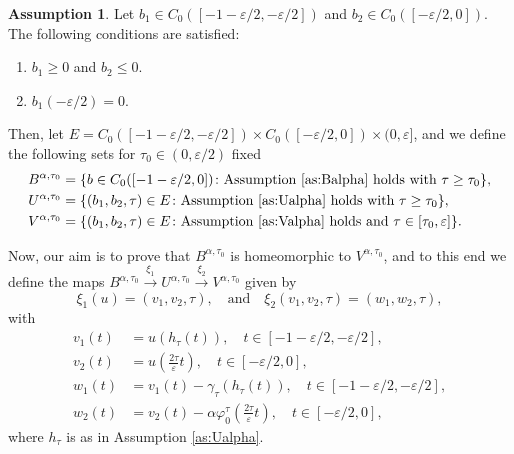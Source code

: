 \documentclass[a4paper,11pt]{article}
\theoremstyle{plain}
\theoremstyle{definition}
\newtheorem{assumption}{Assumption}[section]
\theoremstyle{definition}
\numberwithin{equation}{section}
\begin{document}
\begin{assumption}\label{as:Valpha}
Let $b_1\in C_0([-1-\varepsilon/2, -\varepsilon/2])$ and $b_2\in C_0([-\varepsilon/2,0])$. The following conditions are satisfied:
\begin{enumerate}[label={\roman*)}]
    \item $b_1\geq 0$ and $b_2\leq 0$.
    \item $b_1(-\varepsilon/2) =0$.
\end{enumerate}
\end{assumption}

Then, let $E=C_0([-1-\varepsilon/2,-\varepsilon/2])\times C_0([-\varepsilon/2,0])\times (0,\varepsilon]$, and we define the following sets for $\tau_0\in(0,\varepsilon/2)$ fixed
\begin{align}
    B^{\alpha,\tau_0} &= \{ b\in C_0([-1-\varepsilon/2,0]) \colon \text{Assumption \ref{as:Balpha} holds with}~\tau\geq \tau_0 \},\\
    U^{\alpha,\tau_0} &= \{ (b_1,b_2,\tau)\in E \colon \text{Assumption \ref{as:Ualpha} holds with}~\tau\geq \tau_0 \},\\
    V^{\alpha,\tau_0} &= \{ (b_1,b_2,\tau)\in E \colon \text{Assumption \ref{as:Valpha} holds and}~\tau\in [\tau_0, \varepsilon]\}.
\end{align}

Now, our aim is to prove that $B^{\alpha,\tau_0}$ is homeomorphic to $V^{\alpha,\tau_0}$, and to this end we define the maps $B^{\alpha,\tau_0} \xrightarrow{\xi_1} U^{\alpha,\tau_0} \xrightarrow{\xi_2} V^{\alpha,\tau_0}$ given by
\[
    \xi_1(u) = (v_1,v_2,\tau), \quad \text{and}\quad \xi_2(v_1,v_2,\tau) = (w_1,w_2,\tau),
\]
with
\begin{align*}
    v_1(t)&=u(h_\tau(t)), \quad t\in[-1-\varepsilon/2,-\varepsilon/2],\\
    v_2(t) &= u\left( \frac{2\tau}{\varepsilon} t \right), \quad t\in[-\varepsilon/2,0], \\
    w_1(t) &= v_1(t) -\gamma_\tau(h_\tau(t)), \quad t\in[-1-\varepsilon/2,-\varepsilon/2],\\
    w_2(t)&= v_2(t)- \alpha\varphi_0^{\tau}\left( \frac{2\tau}{\varepsilon}t \right), \quad t\in[-\varepsilon/2,0],
\end{align*}
where $h_\tau$ is as in Assumption \ref{as:Ualpha}.
\end{document}

